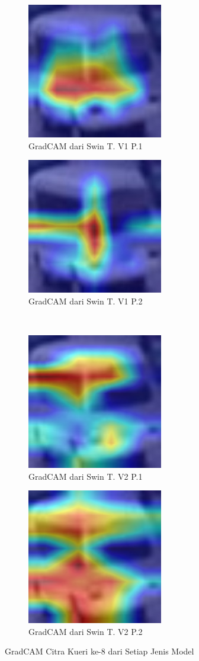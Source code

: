 \begin{figure}[h!]
  \centering
  \begin{subfigure}{.5\textwidth}
    \centering
    \includegraphics[width=.3\linewidth]{gambar/Que8_GradCAMV1P1IT3.jpg}
    \caption{GradCAM dari Swin T. V1 P.1}
    \label{gradcamkuerinomordelapanV1P1}
  \end{subfigure}%
  \begin{subfigure}{.5\textwidth}
    \centering
    \includegraphics[width=.3\linewidth]{gambar/Que8_gradCAMV1P2IT2.jpg}
    \caption{GradCAM dari Swin T. V1 P.2}
    \label{gradcamkuerinomordelapanV1P2}
  \end{subfigure}%
  \\
  \begin{subfigure}{.5\textwidth}
    \centering
    \includegraphics[width=.3\linewidth]{gambar/Que8_V2P1IT1.png}
    \caption{GradCAM dari Swin T. V2 P.1}
    \label{gradcamkuerinomordelapanV2P1}
  \end{subfigure}%
  \begin{subfigure}{.5\textwidth}
    \centering
    \includegraphics[width=.3\linewidth]{gambar/Que8_V2P2IT3.png}
    \caption{GradCAM dari Swin T. V2 P.2}
    \label{gradcamkuerinomordelapanV2P2}
  \end{subfigure}
  \caption{GradCAM Citra Kueri ke-8 dari Setiap Jenis Model}
  \label{fig:gradcamdarisetiapjenismodelpengujianpertama}
\end{figure}


